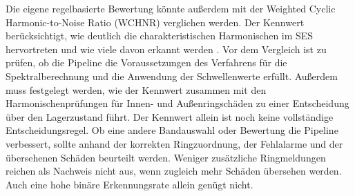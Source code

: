 Die eigene regelbasierte Bewertung könnte außerdem mit der Weighted
Cyclic Harmonic-to-Noise Ratio (WCHNR) verglichen werden. Der Kennwert
berücksichtigt, wie deutlich die
charakteristischen Harmonischen im SES hervortreten und wie viele davon
erkannt werden
\cite[Abschn.~III]{moWeightedCyclicHarmonictoNoise2020}.
Vor dem Vergleich ist zu prüfen, ob die Pipeline die Voraussetzungen des
Verfahrens für die Spektralberechnung und die Anwendung der Schwellenwerte
erfüllt. Außerdem muss festgelegt werden, wie der Kennwert zusammen mit
den Harmonischenprüfungen für Innen- und Außenringschäden zu einer
Entscheidung über den Lagerzustand führt. Der Kennwert allein ist noch
keine vollständige Entscheidungsregel. Ob eine andere Bandauswahl oder
Bewertung die Pipeline verbessert, sollte anhand der korrekten
Ringzuordnung, der Fehlalarme und der übersehenen Schäden beurteilt werden.
Weniger zusätzliche Ringmeldungen reichen als Nachweis nicht aus, wenn
zugleich mehr Schäden übersehen werden. Auch eine hohe binäre
Erkennungsrate allein genügt nicht.

